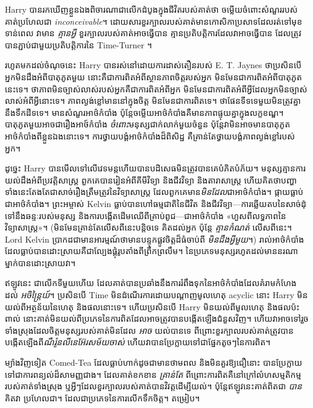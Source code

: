 {{Harry បានរកឃើញខ្លួនឯងពិចារណាជាលើកដំបូងក្នុងជីវិតរបស់គាត់ថា ចម្លើយចំពោះសំណួររបស់គាត់ប្រហែលជា \emph{inconceivable}។ ដោយសារខួរក្បាលរបស់គាត់មានកោសិកាប្រសាទដែលរត់ទៅមុខទាន់ពេល វាមាន \emph{ គ្មានអ្វី} ខួរក្បាលរបស់គាត់អាចធ្វើបាន គ្មានប្រតិបត្តិការដែលវាអាចធ្វើបាន ដែលត្រូវបានភ្ជាប់ជាមួយប្រតិបត្តិការនៃ Time-Turner ។

រហូតមកដល់ចំណុចនេះ Harry បានរស់នៅដោយការដាស់តឿនរបស់ E. T. Jaynes ថាប្រសិនបើអ្នកមិនដឹងអំពីបាតុភូតមួយ នោះគឺជាការពិតអំពីស្ថានភាពចិត្តរបស់អ្នក មិនមែនជាការពិតអំពីបាតុភូតនេះទេ។ ថាភាពមិនច្បាស់លាស់របស់អ្នកគឺជាការពិតអំពីអ្នក មិនមែនជាការពិតអំពីអ្វីដែលអ្នកមិនច្បាស់លាស់អំពីអ្វីនោះទេ។ ភាពល្ងង់ខ្លៅមាននៅក្នុងចិត្ត មិនមែនជាការពិតទេ។ ថាផែនទីទទេមួយមិនត្រូវគ្នានឹងទឹកដីទទេ។ មាន​សំណួរ​អាថ៌កំបាំង ប៉ុន្តែ​ចម្លើយ​អាថ៌កំបាំង​គឺ​មាន​ភាព​ផ្ទុយ​គ្នា​ក្នុង​លក្ខខណ្ឌ។ បាតុភូតមួយអាចជារឿងអាថ៍កំបាំង \emph{ចំពោះ}មនុស្សជាក់លាក់មួយចំនួន ប៉ុន្តែវាមិនអាចមានបាតុភូតអាថ៌កំបាំងពីខ្លួនឯងនោះទេ។ ការថ្វាយបង្គំអាថ៌កំបាំងដ៏ពិសិដ្ឋ គឺគ្រាន់តែថ្វាយបង្គំភាពល្ងង់ខ្លៅរបស់អ្នក។

ដូច្នេះ Harry បាន​មើល​ទៅ​លើ​វេទមន្ត​ហើយ​បាន​បដិសេធ​មិន​ត្រូវ​បាន​គេ​បំភិត​បំភ័យ​។ មនុស្សគ្មានការយល់ដឹងអំពីប្រវត្តិសាស្ត្រ ពួកគេបានរៀនអំពីគីមីវិទ្យា និងជីវវិទ្យា និងតារាសាស្ត្រ ហើយគិតថាបញ្ហាទាំងនេះតែងតែជាសាច់រឿងត្រឹមត្រូវនៃវិទ្យាសាស្រ្ត ដែលពួកគេមាន\emph{មិនដែល}ជាអាថ៌កំបាំង។ ផ្កាយធ្លាប់ជាអាថ៌កំបាំង។ ព្រះអម្ចាស់ Kelvin ធ្លាប់បានហៅធម្មជាតិនៃជីវិត និងជីវវិទ្យា—ការឆ្លើយតបនៃសាច់ដុំទៅនឹងឆន្ទៈរបស់មនុស្ស និងការបង្កើតដើមឈើពីគ្រាប់ពូជ—ជាអាថ៌កំបាំង «ហួសពីលទ្ធភាពនៃវិទ្យាសាស្ត្រ»។ (មិនមែនគ្រាន់តែលើសពីនេះបន្តិចទេ គិតដល់អ្នក ប៉ុន្តែ \emph{គ្មានកំណត់} លើសពីនេះ។ Lord Kelvin ប្រាកដជាមានអារម្មណ៍ថាមានបន្ទុកផ្លូវចិត្តដ៏ធំចាប់ពី \emph{មិនដឹងអ្វីមួយ}។) រាល់អាថ៌កំបាំងដែលធ្លាប់បានដោះស្រាយគឺជាល្បែងផ្គុំរូបតាំងពីព្រឹកព្រលឹម។ នៃ​ប្រភេទ​មនុស្ស​រហូត​ដល់​មាន​នរណា​ម្នាក់​បាន​ដោះស្រាយ​វា​។

ឥឡូវនេះ ជាលើកទីមួយហើយ ដែលគាត់បានប្រឆាំងនឹងការរំពឹងទុកនៃអាថ៌កំបាំងដែលគំរាមកំហែងដល់ \emph{អចិន្រ្តៃយ៍}។ ប្រសិនបើ Time មិនដំណើរការដោយបណ្តាញមូលហេតុ acyclic នោះ Harry មិនយល់ពីអត្ថន័យនៃហេតុ និងផលនោះទេ។ ហើយប្រសិនបើ Harry មិនយល់ពីមូលហេតុ និងផលប៉ះពាល់ នោះគាត់មិនយល់ពីប្រភេទនៃការពិតដែលអាចត្រូវបានបង្កើតឡើងជំនួសវិញ។ ហើយវាអាចទៅរួចទាំងស្រុងដែលចិត្តមនុស្សរបស់គាត់មិនដែល \emph{អាច} យល់បានទេ ពីព្រោះខួរក្បាលរបស់គាត់ត្រូវបានបង្កើតឡើងពី\emph{ណឺរ៉ូនលីនេអ៊ែរសម័យចាស់} ហើយវាបានប្រែក្លាយទៅជាផ្នែកតូចៗនៃការពិត។

ម្យ៉ាងវិញទៀត Comed-Tea ដែលធ្លាប់ហាក់ដូចជាមានថាមពល និងមិនគួរឱ្យជឿនោះ បានប្រែក្លាយទៅជាការពន្យល់ដ៏សាមញ្ញជាង។ ដែលគាត់ខកខាន \emph{គ្រាន់តែ} ពីព្រោះការពិតគឺនៅក្រៅលំហសម្មតិកម្មរបស់គាត់ទាំងស្រុង ឬអ្វីៗដែលខួរក្បាលរបស់គាត់បានវិវត្តដើម្បីយល់។ ប៉ុន្តែឥឡូវនេះគាត់ពិតជា \emph{បាន} គិតវា ប្រហែលជា។ ដែលជាប្រភេទនៃការលើកទឹកចិត្ត។ តម្រៀប។

}}
